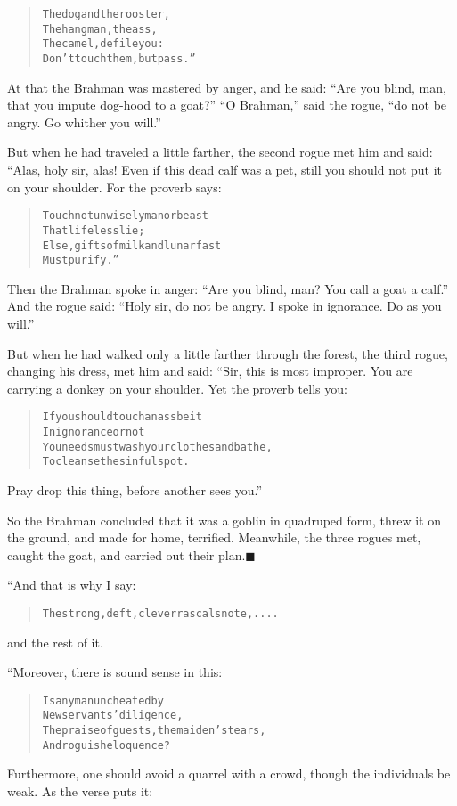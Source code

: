 \documentclass[article, twoside, 14pt]{memoir}
\newcommand{\qed}{\hfill \ensuremath{\blacksquare}}
\renewenvironment{verbatim}{%
\begin{quote}%
\vskip -10pt%
\begin{alltt}\normalfont\large}{\end{alltt}%
\end{quote}%
\vskip -10pt
} %
\begin{document}
\begin{verbatim}
The dog and the rooster,
The hangman, the ass,
The camel, defile you:
Don't touch them, but pass.”
\end{verbatim}
At that the Brahman was mastered by anger, and he said:
``Are you blind, man, that you impute dog-hood to a goat?''
``O Brahman,'' said the rogue,
``do not be angry. Go whither you will.''

But when he had traveled a little farther, the second rogue met him
and said: “Alas, holy sir, alas! Even if this dead calf was a pet,
still you should not put it on your shoulder. For the proverb
says:

\begin{verbatim}
Touch not unwisely man or beast
    That lifeless lie;
Else, gifts of milk and lunar fast
    Must purify.”
\end{verbatim}
Then the Brahman spoke in anger:
``Are you blind, man? You call a goat a calf.'' And the rogue said:
``Holy sir, do not be angry. I spoke in ignorance. Do as you will.''

But when he had walked only a little farther through the forest,
the third rogue, changing his dress, met him and said: “Sir, this
is most improper. You are carrying a donkey on your shoulder. Yet
the proverb tells you:

\begin{verbatim}
If you should touch an ass{\textemdash}be it
    In ignorance or not{\textemdash}
You needs must wash your clothes and bathe,
    To cleanse the sinful spot.
\end{verbatim}
Pray drop this thing, before another sees you.”

So the Brahman concluded that it was a goblin in quadruped form,
threw it on the ground, and made for home, terrified. Meanwhile,
the three rogues met, caught the goat, and carried out their
plan.\hyperref[s51]{\qed}

“And that is why I say:

\begin{verbatim}
The strong, deft, clever rascals note, ....
\end{verbatim}
and the rest of it.

“Moreover, there is sound sense in this:

\begin{verbatim}
Is any man uncheated by
    New servants’ diligence,
The praise of guests, the maiden’s tears,
    And roguish eloquence?
\end{verbatim}
Furthermore, one should avoid a quarrel with a crowd, though the
individuals be weak. As the verse puts it:
\end{document}
